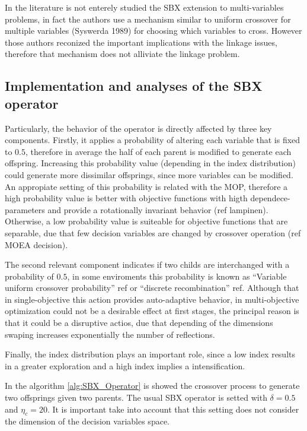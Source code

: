 In the literature \cite{Joel:SBX1994} is not enterely studied the SBX extension to multi-variables problems, in fact the authors use a mechanism similar to uniform crossover for multiple variables (Syswerda 1989) for choosing which variables to cross.
%
However those authors reconized the important implications with the linkage issues, therefore that mechanism does not alliviate the linkage problem.
%


\subsection{Implementation and analyses of the SBX operator}
Particularly, the behavior of the operator is directly affected by three key components.
%
Firstly, it applies a probability of altering each variable that is fixed to $0.5$, therefore in average the half of each parent is modified to generate each offspring.
%
Increasing this probability value (depending in the index distribution) could generate more dissimilar offsprings, since more variables can be modified.
%
An appropiate setting of this probability is related with the MOP, therefore a high probability value is better with objective functions with higth dependece-parameters and provide a rotationally invariant behavior (ref lampinen).
%
Otherwise, a low probability value is suiteable for objective functions that are separable, due that few decision variables are changed by crossover operation (ref MOEA decision).
%

%
The second relevant component indicates if two childs are interchanged with a probability of $0.5$, in some enviroments this probability is known as ``Variable uniform crossover probability'' ref or ``discrete recombination'' ref.
%
Although that in single-objective this action provides auto-adaptive behavior, in multi-objective optimization could not be a desirable effect at first stages, the principal reason is that it could be a disruptive actios, due that depending of the dimensions swaping increases exponentially the number of reflections.
%


%
Finally, the index distribution plays an important role, since a low index results in a greater exploration and a high index implies a intensification.

In the algorithm \ref{alg:SBX_Operator} is showed the crossover process to generate two offsprings given two parents.
%
The usual SBX operator is setted with $\delta = 0.5$ and $\eta_c = 20$.
%
It is important take into account that this setting does not consider the dimension of the decision variables space.

